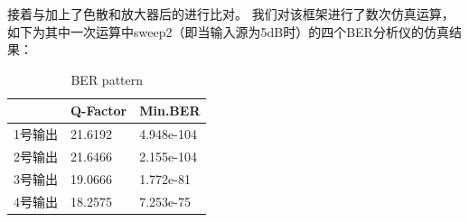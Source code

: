\documentclass[12pt, a4paper, oneside]{article}
\begin{document}
\begin{spacing}{2.0}
接着与加上了色散和放大器后的进行比对。
我们对该框架进行了数次仿真运算，如下为其中一次运算中sweep2（即当输入源为5dB时）的四个BER分析仪的仿真结果：
\begin{table}[H]
  \centering
  \caption{BER pattern}
  \begin{tabular}{|l|l|l|} 
  \hline
    & Q-Factor & Min.BER    \\ 
  \hline
  1号输出 & 21.6192  & 4.948e-104  \\ 
  \hline
  2号输出 & 21.6466  & 2.155e-104  \\ 
  \hline
  3号输出 & 19.0666   & 1.772e-81  \\ 
  \hline
  4号输出 & 18.2575  & 7.253e-75  \\
  \hline
  \end{tabular}
  \end{table}


\end{spacing}
\end{document}
